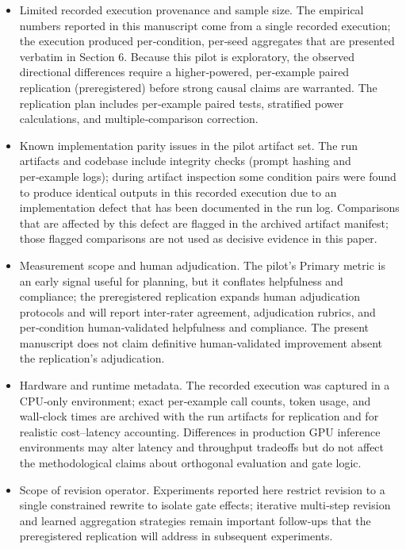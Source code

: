 \documentclass{article}
\begin{document}
\begin{itemize}
 \item Limited recorded execution provenance and sample size. The empirical numbers reported in this manuscript come from a single recorded execution; the execution produced per‑condition, per‑seed aggregates that are presented verbatim in Section 6. Because this pilot is exploratory, the observed directional differences require a higher‑powered, per‑example paired replication (preregistered) before strong causal claims are warranted. The replication plan includes per‑example paired tests, stratified power calculations, and multiple‑comparison correction.
 \item Known implementation parity issues in the pilot artifact set. The run artifacts and codebase include integrity checks (prompt hashing and per‑example logs); during artifact inspection some condition pairs were found to produce identical outputs in this recorded execution due to an implementation defect that has been documented in the run log. Comparisons that are affected by this defect are flagged in the archived artifact manifest; those flagged comparisons are not used as decisive evidence in this paper.
 \item Measurement scope and human adjudication. The pilot's Primary metric is an early signal useful for planning, but it conflates helpfulness and compliance; the preregistered replication expands human adjudication protocols and will report inter‑rater agreement, adjudication rubrics, and per‑condition human‑validated helpfulness and compliance. The present manuscript does not claim definitive human‑validated improvement absent the replication's adjudication.
 \item Hardware and runtime metadata. The recorded execution was captured in a CPU‑only environment; exact per‑example call counts, token usage, and wall‑clock times are archived with the run artifacts for replication and for realistic cost--latency accounting. Differences in production GPU inference environments may alter latency and throughput tradeoffs but do not affect the methodological claims about orthogonal evaluation and gate logic.
 \item Scope of revision operator. Experiments reported here restrict revision to a single constrained rewrite to isolate gate effects; iterative multi‑step revision and learned aggregation strategies remain important follow‑ups that the preregistered replication will address in subsequent experiments.
\end{itemize}
\end{document}
